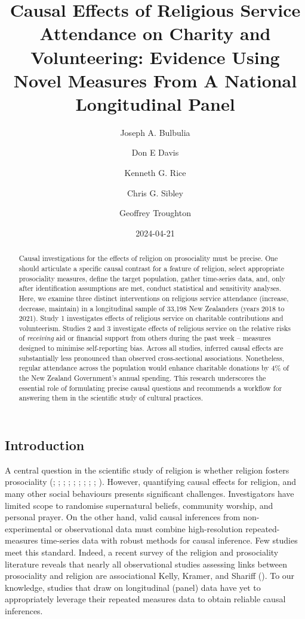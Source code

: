 \documentclass[
  single column]{article}
\title{Causal Effects of Religious Service Attendance on Charity and
Volunteering: Evidence Using Novel Measures From A National Longitudinal
Panel}
\author{Joseph A. Bulbulia \and Don E Davis \and Kenneth G.
Rice \and Chris G. Sibley \and Geoffrey Troughton}
\date{2024-04-21}
\begin{document}
\maketitle
\begin{abstract}
Causal investigations for the effects of religion on prosociality must
be precise. One should articulate a specific causal contrast for a
feature of religion, select appropriate prosociality measures, define
the target population, gather time-series data, and, only after
identification assumptions are met, conduct statistical and sensitivity
analyses. Here, we examine three distinct interventions on religious
service attendance (increase, decrease, maintain) in a longitudinal
sample of 33,198 New Zealanders (years 2018 to 2021). Study 1
investigates effects of religious service on charitable contributions
and volunteerism. Studies 2 and 3 investigate effects of religious
service on the relative risks of \emph{receiving} aid or financial
support from others during the past week -- measures designed to
minimise self-reporting bias. Across all studies, inferred causal
effects are substantially less pronounced than observed cross-sectional
associations. Nonetheless, regular attendance across the population
would enhance charitable donations by 4\% of the New Zealand
Government's annual spending. This research underscores the essential
role of formulating precise causal questions and recommends a workflow
for answering them in the scientific study of cultural practices.
\end{abstract}

\subsection{Introduction}\label{introduction}

A central question in the scientific study of religion is whether
religion fosters prosociality (; ;
;
;
;
;
;
;
;
). However, quantifying causal
effects for religion, and many other social behaviours presents
significant challenges. Investigators have limited scope to randomise
supernatural beliefs, community worship, and personal prayer. On the
other hand, valid causal inferences from non-experimental or
observational data must combine high-resolution repeated-measures
time-series data with robust methods for causal inference. Few studies
meet this standard. Indeed, a recent survey of the religion and
prosociality literature reveals that nearly all observational studies
assessing links between prosociality and religion are associational
Kelly, Kramer, and Shariff ().
To our knowledge, studies that draw on longitudinal (panel) data have
yet to appropriately leverage their repeated measures data to obtain
reliable causal inferences.
\end{document}
